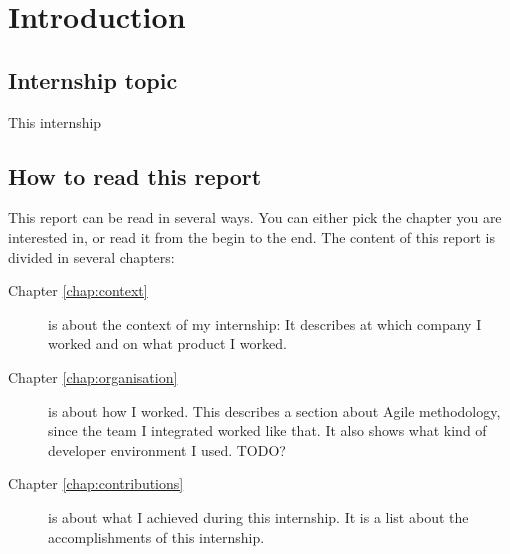 \chapter{Introduction}

\section{Internship topic}
This internship

\section{How to read this report}

This report can be read in several ways. You can either pick the chapter you are
interested in, or read it from the begin to the end. The content of this report
is divided in several chapters:

\begin{description}
    \item[Chapter \ref{chap:context}] is about the context of my internship: It describes at which company I worked and on what product I worked.
    \item[Chapter \ref{chap:organisation}] is about how I worked. This describes a section about Agile methodology, since the
        team I integrated worked like that. It also shows what kind of developer environment I used. TODO?
    \item[Chapter \ref{chap:contributions}] is about what I achieved during this internship. It is a list about the accomplishments
        of this internship.
\end{description}
